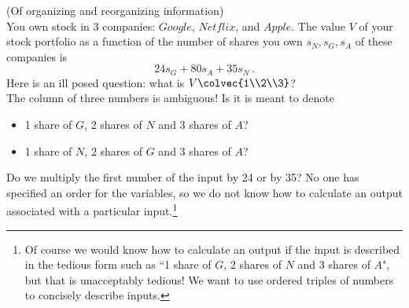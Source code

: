 \begin{example} (Of organizing and reorganizing information)\\ \label{OrderInfo}
You own stock in 3 companies: $Google$, $Netflix$, and $Apple$. 
The value $V$ of your stock portfolio as a function of the number of shares you own $s_{N}, s_{G},s_{A}$ of these companies 
 is %
$$
24s_{G}+80s_{A}+35s_{N}\,.$$
Here is an ill posed question: what is $V\colvec{1\\2\\3} $?\\

The column of three numbers is ambiguous! 
Is it is meant to denote %
\begin{itemize}
\item 1 share of ${G}$, 2 shares of ${N}$ and 3 shares of ${A}$? 
\item 1 share of ${N}$, 2 shares of ${G}$ and 3 shares of ${A}$?  
\end{itemize}
Do we multiply the first number of the input by 24 or by 35? 
No one has specified an order for the variables, 
so we do not know how to calculate an output associated with a particular input.\!\footnote{Of course we would know how to calculate an output if the input is described in the tedious form such as ``1 share of ${G}$, 2 shares of ${N}$ and 3 shares of ${A}$", but that is unacceptably tedious! We want to use ordered triples of numbers to concisely describe inputs.}%


\end{example}
